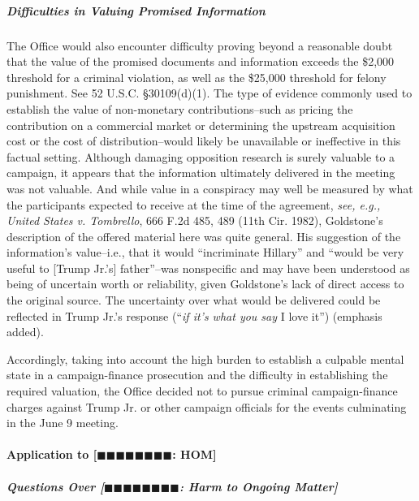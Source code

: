\subparagraph{Difficulties in Valuing Promised Information}
The Office would also encounter difficulty proving beyond a reasonable doubt that the value of the promised documents and information exceeds the \$2,000 threshold for a criminal violation, as well as the \$25,000 threshold for felony punishment.
See 52 U.S.C. \S 30109(d)(1).
The type of evidence commonly used to establish the value of non-monetary contributions--such as pricing the contribution on a commercial market or determining the upstream acquisition cost or the cost of distribution--would likely be unavailable or ineffective in this factual setting.
Although damaging opposition research is surely valuable to a campaign, it appears that the information ultimately delivered in the meeting was not valuable.
And while value in a conspiracy may well be measured by what the participants expected to receive at the time of the agreement, \textit{see, e.g., United States v. Tombrello}, 666 F.2d 485, 489 (11th Cir. 1982), Goldstone's description of the offered material here was quite general.
His suggestion of the information's value--i.e., that it would ``incriminate Hillary'' and ``would be very useful to [Trump Jr.'s] father''--was nonspecific and may have been understood as being of uncertain worth or reliability, given Goldstone's lack of direct access to the original source.
The uncertainty over what would be delivered could be reflected in Trump Jr.'s response (``\textit{if it's what you say} I love it'') (emphasis added).

Accordingly, taking into account the high burden to establish a culpable mental state in a campaign-finance prosecution and the difficulty in establishing the required valuation, the Office decided not to pursue criminal campaign-finance charges against Trump Jr. or other campaign officials for the events culminating in the June 9 meeting.

\paragraph{Application to [$\blacksquare\blacksquare\blacksquare\blacksquare\blacksquare\blacksquare\blacksquare\blacksquare$: HOM]}

\subparagraph{Questions Over [$\blacksquare\blacksquare\blacksquare\blacksquare\blacksquare\blacksquare\blacksquare\blacksquare$: Harm to Ongoing Matter]}


